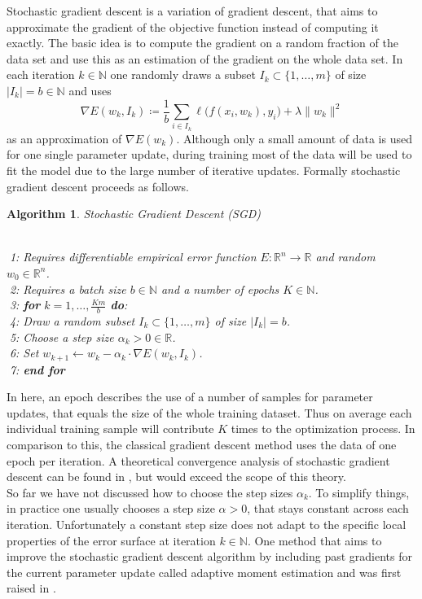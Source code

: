 \documentclass[11pt, a4paper]{article}
\newtheorem{algorithm}[theorem]{Algorithm}
\newcommand{\N}{\mathds{N}}
\newcommand{\R}{\mathds{R}}
\begin{document}
Stochastic gradient descent is a variation of gradient descent, that aims to approximate the gradient of the objective function instead of computing it exactly. The basic idea is to compute the gradient on a random fraction of the data set and use this as an estimation of the gradient on the whole data set. In each iteration $k \in \N$ one randomly draws a subset $I_k \subset \{ 1, \dots, m \}$ of size $| I_k | = b \in \N$ and uses
\[ \nabla E(w_k,I_k) \coloneq \frac{1}{b} \sum_{i \in I_k}^{}  \ell \big ( f(x_i,w_k),y_i \big) + \lambda \| w_k \|^2 \]
as an approximation of $\nabla E(w_k)$. Although only a small amount of data is used for one single parameter update, during training most of the data will be used to fit the model due to the large number of iterative updates. Formally stochastic gradient descent proceeds as follows.

\begin{algorithm}
\caption{Stochastic Gradient Descent (SGD)} \ \\
\textcolor{white}{$\Big |$}1: Requires differentiable empirical error function $E: \R^n \to \R$ and random $w_0 \in \R^n$. \\
\textcolor{white}{$\Big |$}2: Requires a batch size $b \in \N$ and a number of epochs $K \in \N$. \\
\textcolor{white}{$\Big |$}3: \textbf{for} $k=1, \dots, \frac{Km}{b}$ \textbf{do}: \\
\textcolor{white}{$\Big |$}4: \quad Draw a random subset $I_k \subset \{1, \dots, m \}$ of size $| I_k | = b$. \\
\textcolor{white}{$\Big |$}5: \quad Choose a step size $\alpha_k > 0 \in \R$. \\
\textcolor{white}{$\Big |$}6: \quad Set $w_{k+1} \leftarrow w_k - \alpha_k \cdot \nabla E(w_k,I_k)$. \\
\textcolor{white}{$\Big |$}7: \textbf{end for}
\end{algorithm}

In here, an epoch describes the use of a number of samples for parameter updates, that equals the size of the whole training dataset. Thus on average each individual training sample will contribute $K$ times to the optimization process. In comparison to this, the classical gradient descent method uses the data of one epoch per iteration. A theoretical convergence analysis of stochastic gradient descent can be found in \cite{SGD}, but would exceed the scope of this theory. \\

So far we have not discussed how to choose the step sizes $\alpha_k$. To simplify things, in practice one usually chooses a step size $\alpha > 0$, that stays constant across each iteration. Unfortunately a constant step size does not adapt to the specific local properties of the error surface at iteration $k \in \N$. One method that aims to improve the stochastic gradient descent algorithm by including past gradients for the current parameter update called adaptive moment estimation and was first raised in \cite{Adam}. \\
\end{document}
